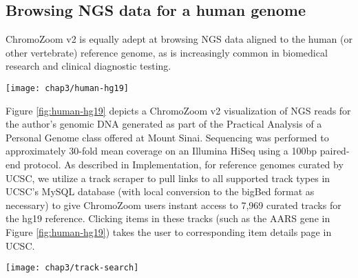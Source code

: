 \subsection{Browsing NGS data for a human genome}

ChromoZoom v2 is equally adept at browsing NGS data aligned to the human (or other vertebrate) reference genome, as is increasingly common in biomedical research and clinical diagnostic testing.
\begin{figure*}[htb]
  \texttt{[image: chap3/human-hg19]}               
  \caption[NGS reads for the author's genome aligned to hg19]{\textbf{NGS reads for the author's genome aligned to hg19}, displayed in paired mode, and corresponding variant calls. The ``UCSC Genes'' and ``ClinVar Main'' tracks are mirrored from UCSC, while the other two are custom tracks loaded from URLs provided by the user; ``alignedReadsPaired'' is in BAM format while ``calledVariants'' is a tabix-compressed VCF file. A heterozygous C/T variant in the AARS coding sequence is visible to the righthand side, which is annotated in the ClinVar track as a benign variant (light gray G>A; annotated to reverse strand). More alignments are stacked vertically than can be displayed, as indicated by the orange clipping indicator, which could be remedied by resizing the tracks or using the adjacent scrollbar.\vspace{1em}}
  \label{fig:human-hg19}
\end{figure*}
Figure \ref{fig:human-hg19} depicts a ChromoZoom v2 visualization of NGS reads for the author's genomic DNA generated as part of the Practical Analysis of a Personal Genome class offered at Mount Sinai.\autocite{Linderman2015} Sequencing was performed to approximately 30-fold mean coverage on an Illumina HiSeq using a 100bp paired-end protocol. As described in Implementation, for reference genomes curated by UCSC, we utilize a track scraper to pull links to all supported track types in UCSC's MySQL database (with local conversion to the bigBed format as necessary) to give ChromoZoom users instant access to 7,969 curated tracks for the hg19 reference. Clicking items in these tracks (such as the AARS gene in Figure \ref{fig:human-hg19}) takes the user to corresponding item details page in UCSC.

\begin{marginfigure}
  \texttt{[image: chap3/track-search]}               
  \caption[Track searching interface for UCSC reference genomes.]{A searchable track interface allows quick discovery of relevant tracks from thousands of tables pulled from UCSC's databases, which can be added with a single click.}
  \label{fig:track-search}
\end{marginfigure}

